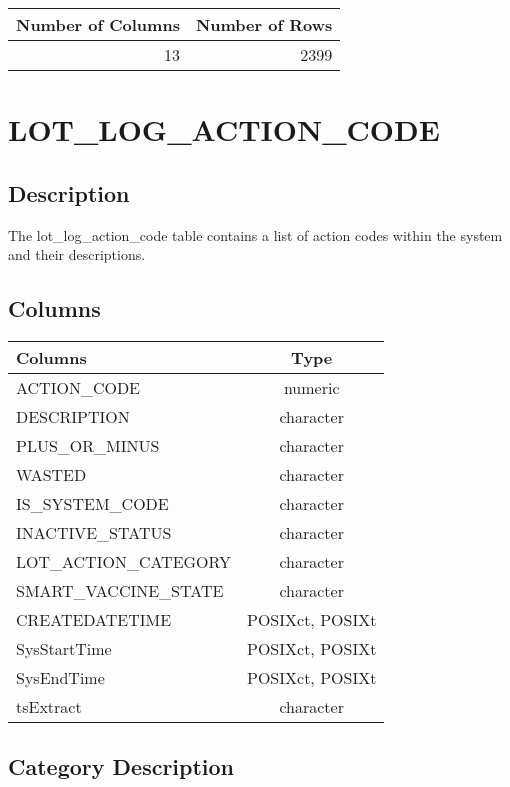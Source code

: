 \documentclass[
  letterpaper,
  DIV=11,
  numbers=noendperiod]{scrreprt}
\begin{document}
\begin{longtable}{rr}
\toprule
Number of Columns & Number of Rows \\ 
\midrule
13 & 2399 \\ 
\bottomrule
\end{longtable}

\hypertarget{lot_log_action_code}{%
\chapter*{LOT\_LOG\_ACTION\_CODE}\label{lot_log_action_code}}

\hypertarget{description-18}{%
\section*{Description}\label{description-18}}

The lot\_log\_action\_code table contains a list of action codes within
the system and their descriptions.

\hypertarget{columns-18}{%
\section*{Columns}\label{columns-18}}

\begin{longtable}{lc}
\toprule
Columns & Type \\ 
\midrule
ACTION\_CODE & numeric \\ 
DESCRIPTION & character \\ 
PLUS\_OR\_MINUS & character \\ 
WASTED & character \\ 
IS\_SYSTEM\_CODE & character \\ 
INACTIVE\_STATUS & character \\ 
LOT\_ACTION\_CATEGORY & character \\ 
SMART\_VACCINE\_STATE & character \\ 
CREATEDATETIME & POSIXct, POSIXt \\ 
SysStartTime & POSIXct, POSIXt \\ 
SysEndTime & POSIXct, POSIXt \\ 
tsExtract & character \\ 
\bottomrule
\end{longtable}

\hypertarget{category-description-18}{%
\section*{Category Description}\label{category-description-18}}
\end{document}
